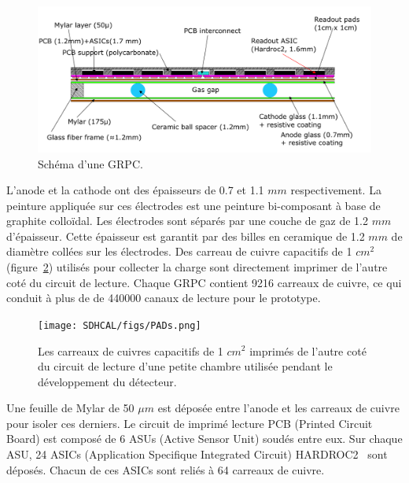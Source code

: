 \begin{figure}[!h]
  \begin{center}
    \includegraphics[width=.8\textwidth]{SDHCAL/figs/GRPC-K7.png}
    \caption{Schéma d'une GRPC.}
    \label{fig:grpc}
  \end{center}
\end{figure}
L'anode et la cathode ont des épaisseurs de 0.7 et 1.1 $mm$ respectivement. La peinture appliquée sur ces électrodes est une peinture bi-composant à base de graphite colloïdal. Les électrodes sont séparés par une couche de gaz de 1.2 $mm$ d'épaisseur. Cette épaisseur est garantit par des billes en ceramique de 1.2 $mm$ de diamètre collées sur les électrodes. Des carreau de cuivre capacitifs de 1 $cm^2$ (figure~\ref{fig:carreaux}) utilisés pour collecter la charge sont directement imprimer de l'autre coté du circuit de lecture. Chaque GRPC contient 9216 carreaux de cuivre, ce qui conduit à plus de de 440000 canaux de lecture pour le prototype.
\begin{figure}[!h]
  \begin{center}
    \texttt{[image: SDHCAL/figs/PADs.png]}
    \caption{Les carreaux de cuivres capacitifs de 1 $cm^2$ imprimés de l'autre coté du circuit de lecture d'une petite chambre utilisée pendant le développement du détecteur.}
    \label{fig:carreaux}
  \end{center}
\end{figure}
Une feuille de Mylar de 50 $\mu m$ est déposée entre l'anode et les carreaux de cuivre pour isoler ces derniers. Le circuit de imprimé lecture PCB (Printed Circuit Board) est composé de 6 ASUs (Active Sensor Unit) soudés entre eux. Sur chaque ASU, 24 ASICs (Application Specifique Integrated Circuit) HARDROC2~\cite{omega} sont déposés. Chacun de ces ASICs sont reliés à 64 carreaux de cuivre. 
